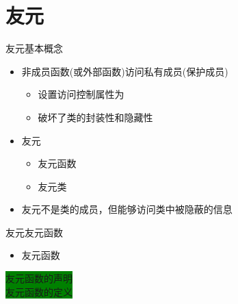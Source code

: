 \section[友元]{友元}\label{sec:chap03-sec05}
\begin{frame}[t, fragile]{友元}{基本概念}%
  \stretchon
  \begin{itemize}
  \item 非成员函数(或外部函数)访问私有成员(保护成员)
    \begin{itemize}
    \item 设置访问控制属性为
    \item 破坏了类的封装性和隐藏性
    \end{itemize}
  \item 友元
    \begin{itemize}
    \item 友元函数
    \item 友元类
    \end{itemize}
  \item \alert{友元不是类的成员}，但能够\alert{访问类中被隐蔽的信息}
  \end{itemize}
  \stretchoff
\end{frame}
\begin{frame}[t, fragile]{友元}{友元函数}%
  \begin{itemize}
  \item 友元函数
  \end{itemize}
  \begin{center}
    \hspace{2em}
    \begin{minipage}{0.48\linewidth}
    \end{minipage}\qquad
    \begin{minipage}{0.32\linewidth}
      \centering
      \tiny
      \colorbox{green}{友元函数的声明}\\
      \vspace{8ex}
      \colorbox{green}{友元函数的定义}\\
      \vfill
    \end{minipage}
  \end{center}
\end{frame}

